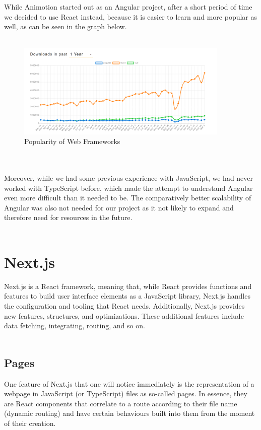 While Animotion started out as an Angular project, after a short period of time we decided to use React instead, because it 
is easier to learn and more popular as well, as can be seen in the graph below.
\\
\\
\begin{figure}[htb]
  \centering
  \includegraphics[width=0.9\textwidth]{pics/webframeworkpop.png}
  \caption{Popularity of Web Frameworks}
  \label{fig:webpop}
\end{figure}
\\
\\
Moreover, while we had some previous experience with JavaScript, we had never worked with TypeScript before, which made the attempt 
to understand Angular even more difficult than it needed to be. The comparatively better scalability of Angular was also not needed
for our project as it not likely to expand and therefore need for resources in the future.
\\
\\
\section{Next.js}
Next.js is a React framework, meaning that, while React provides functions and features to build user interface elements
as a JavaScript library, Next.js handles the configuration and tooling that React needs. Additionally, Next.js provides
new features, structures, and optimizations. These additional features include data fetching, integrating, routing,
and so on. \cite{NextjsDescription}
\\
\\
\subsection{Pages}
One feature of Next.js that one will notice immediately is the representation of a webpage in JavaScript (or TypeScript) files as
so-called pages. In essence, they are React components that correlate to a route according to their file name (dynamic routing) and
have certain behaviours built into them from the moment of their creation.

